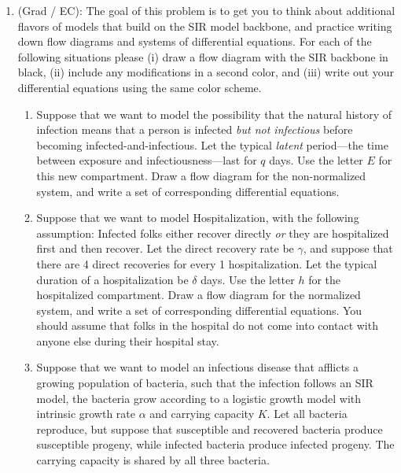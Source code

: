 \documentclass[11pt]{article}
\begin{document}
\begin{enumerate}
\clearpage
\item (Grad / EC): The goal of this problem is to get you to think about additional flavors of models that build on the SIR model backbone, and practice writing down flow diagrams and systems of differential equations. For each of the following situations please (i) draw a flow diagram with the SIR backbone in black, (ii) include any modifications in a second color, and (iii) write out your differential equations using the same color scheme. 
\begin{enumerate}
	\item Suppose that we want to model the possibility that the natural history of infection means that a person is infected {\it but not infectious} before becoming infected-and-infectious. Let the typical {\it latent} period---the time between exposure and infectiousness---last for $q$ days. Use the letter $E$ for this new compartment. Draw a flow diagram for the non-normalized system, and write a set of corresponding differential equations. 
	\item Suppose that we want to model Hospitalization, with the following assumption: Infected folks either recover directly {\it or} they are hospitalized first and then recover. Let the direct recovery rate be $\gamma$, and suppose that there are 4 direct recoveries for every 1 hospitalization. Let the typical duration of a hospitalization be $\delta$ days. Use the letter $h$ for the hospitalized compartment. Draw a flow diagram for the normalized system, and write a set of corresponding differential equations. You should assume that folks in the hospital do not come into contact with anyone else during their hospital stay.
	\item Suppose that we want to model an infectious disease that afflicts a growing population of bacteria, such that the infection follows an SIR model, the bacteria grow according to a logistic growth model with intrinsic growth rate $\alpha$ and carrying capacity $K$. Let all bacteria reproduce, but suppose that susceptible and recovered bacteria produce susceptible progeny, while infected bacteria produce infected progeny. The carrying capacity is shared by all three bacteria. 
\end{enumerate}

\end{enumerate}
\end{document}
